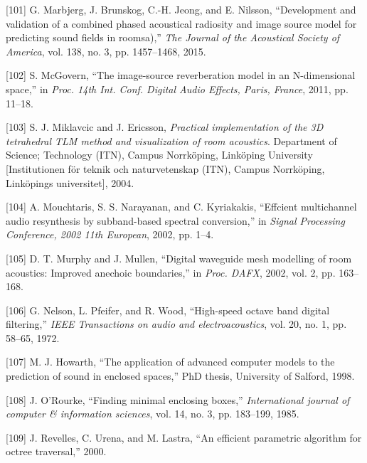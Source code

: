 \documentclass[]{scrreprt}
\begin{document}
\hypertarget{ref-marbjergux5fdevelopmentux5f2015}{}
{[}101{]} G. Marbjerg, J. Brunskog, C.-H. Jeong, and E. Nilsson,
``Development and validation of a combined phased acoustical radiosity
and image source model for predicting sound fields in roomsa),''
\emph{The Journal of the Acoustical Society of America}, vol. 138, no.
3, pp. 1457--1468, 2015.

\hypertarget{ref-mcgovernux5fimage-sourceux5f2011}{}
{[}102{]} S. McGovern, ``The image-source reverberation model in an
N-dimensional space,'' in \emph{Proc. 14th Int. Conf. Digital Audio
Effects, Paris, France}, 2011, pp. 11--18.

\hypertarget{ref-miklavcicux5fpracticalux5f2004}{}
{[}103{]} S. J. Miklavcic and J. Ericsson, \emph{Practical
implementation of the 3D tetrahedral TLM method and visualization of
room acoustics}. Department of Science; Technology (ITN), Campus
Norrköping, Linköping University {[}Institutionen för teknik och
naturvetenskap (ITN), Campus Norrköping, Linköpings universitet{]},
2004.

\hypertarget{ref-mouchtarisux5feffcientux5f2002}{}
{[}104{]} A. Mouchtaris, S. S. Narayanan, and C. Kyriakakis, ``Effcient
multichannel audio resynthesis by subband-based spectral conversion,''
in \emph{Signal Processing Conference, 2002 11th European}, 2002, pp.
1--4.

\hypertarget{ref-murphyux5fdigitalux5f2002}{}
{[}105{]} D. T. Murphy and J. Mullen, ``Digital waveguide mesh modelling
of room acoustics: Improved anechoic boundaries,'' in \emph{Proc. DAFX},
2002, vol. 2, pp. 163--168.

\hypertarget{ref-nelsonux5fhigh-speedux5f1972}{}
{[}106{]} G. Nelson, L. Pfeifer, and R. Wood, ``High-speed octave band
digital filtering,'' \emph{IEEE Transactions on audio and
electroacoustics}, vol. 20, no. 1, pp. 58--65, 1972.

\hypertarget{ref-howarthux5fapplicationux5f1998}{}
{[}107{]} M. J. Howarth, ``The application of advanced computer models
to the prediction of sound in enclosed spaces,'' PhD thesis, University
of Salford, 1998.

\hypertarget{ref-orourkeux5ffindingux5f1985}{}
{[}108{]} J. O'Rourke, ``Finding minimal enclosing boxes,''
\emph{International journal of computer \& information sciences}, vol.
14, no. 3, pp. 183--199, 1985.

\hypertarget{ref-revellesux5fefficientux5f2000}{}
{[}109{]} J. Revelles, C. Urena, and M. Lastra, ``An efficient
parametric algorithm for octree traversal,'' 2000.
\end{document}
